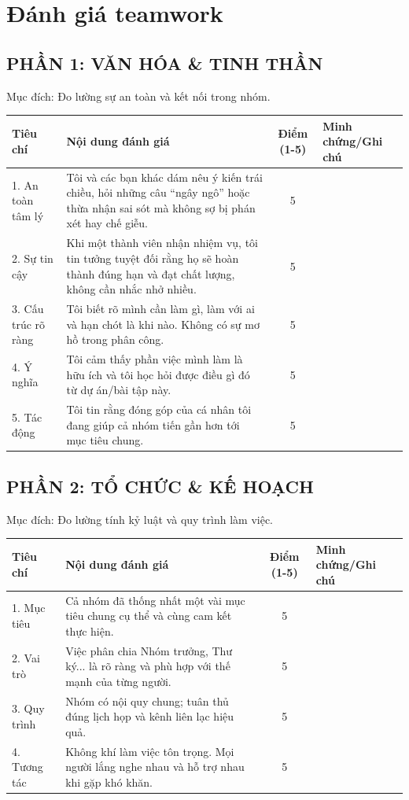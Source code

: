 \documentclass{article}
\begin{document}
\section{Đánh giá teamwork}

\subsection{PHẦN 1: VĂN HÓA \& TINH THẦN}
\noindent Mục đích: Đo lường sự an toàn và kết nối trong nhóm.

\begin{tabularx}{\textwidth}{|l|X|c|X|}
\hline
\textbf{Tiêu chí} & \textbf{Nội dung đánh giá} & \textbf{Điểm (1-5)} & \textbf{Minh chứng/Ghi chú} \\ \hline
1. An toàn tâm lý & Tôi và các bạn khác dám nêu ý kiến trái chiều, hỏi những câu ``ngây ngô'' hoặc thừa nhận sai sót mà không sợ bị phán xét hay chế giễu. & 5 & \\ \hline
2. Sự tin cậy & Khi một thành viên nhận nhiệm vụ, tôi tin tưởng tuyệt đối rằng họ sẽ hoàn thành đúng hạn và đạt chất lượng, không cần nhắc nhở nhiều. & 5 & \\ \hline
3. Cấu trúc rõ ràng & Tôi biết rõ mình cần làm gì, làm với ai và hạn chót là khi nào. Không có sự mơ hồ trong phân công. & 5 & \\ \hline
4. Ý nghĩa & Tôi cảm thấy phần việc mình làm là hữu ích và tôi học hỏi được điều gì đó từ dự án/bài tập này. & 5 & \\ \hline
5. Tác động & Tôi tin rằng đóng góp của cá nhân tôi đang giúp cả nhóm tiến gần hơn tới mục tiêu chung. & 5 & \\ \hline
\end{tabularx}

\subsection{PHẦN 2: TỔ CHỨC \& KẾ HOẠCH}
\noindent Mục đích: Đo lường tính kỷ luật và quy trình làm việc.

\begin{tabularx}{\textwidth}{|l|X|c|X|}
\hline
\textbf{Tiêu chí} & \textbf{Nội dung đánh giá} & \textbf{Điểm (1-5)} & \textbf{Minh chứng/Ghi chú} \\ \hline
1. Mục tiêu & Cả nhóm đã thống nhất một vài mục tiêu chung cụ thể và cùng cam kết thực hiện. & 5 & \\ \hline
2. Vai trò & Việc phân chia Nhóm trưởng, Thư ký... là rõ ràng và phù hợp với thế mạnh của từng người. & 5 & \\ \hline
3. Quy trình & Nhóm có nội quy chung; tuân thủ đúng lịch họp và kênh liên lạc hiệu quả. & 5 & \\ \hline
4. Tương tác & Không khí làm việc tôn trọng. Mọi người lắng nghe nhau và hỗ trợ nhau khi gặp khó khăn. & 5 & \\ \hline
\end{tabularx}
\end{document}
